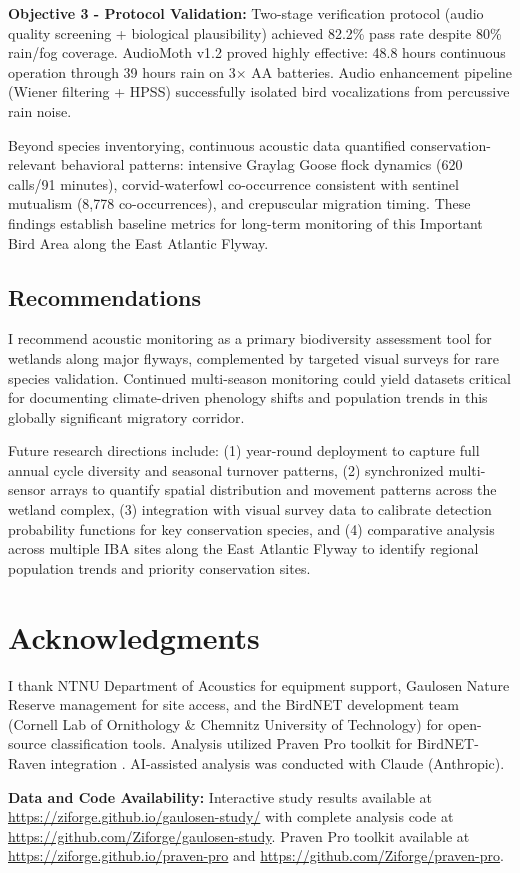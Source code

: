 \documentclass[english,twocolumn]{article}
\begin{document}
\textbf{Objective 3 - Protocol Validation:} Two-stage verification protocol (audio quality screening + biological plausibility) achieved 82.2\% pass rate despite 80\% rain/fog coverage. AudioMoth v1.2 proved highly effective: 48.8 hours continuous operation through 39 hours rain on 3× AA batteries. Audio enhancement pipeline (Wiener filtering + HPSS) successfully isolated bird vocalizations from percussive rain noise.

Beyond species inventorying, continuous acoustic data quantified conservation-relevant behavioral patterns: intensive Graylag Goose flock dynamics (620 calls/91 minutes), corvid-waterfowl co-occurrence consistent with sentinel mutualism (8,778 co-occurrences), and crepuscular migration timing. These findings establish baseline metrics for long-term monitoring of this Important Bird Area along the East Atlantic Flyway.

\subsection{Recommendations}

I recommend acoustic monitoring as a primary biodiversity assessment tool for wetlands along major flyways, complemented by targeted visual surveys for rare species validation. Continued multi-season monitoring could yield datasets critical for documenting climate-driven phenology shifts and population trends in this globally significant migratory corridor.

Future research directions include: (1) year-round deployment to capture full annual cycle diversity and seasonal turnover patterns, (2) synchronized multi-sensor arrays to quantify spatial distribution and movement patterns across the wetland complex, (3) integration with visual survey data to calibrate detection probability functions for key conservation species, and (4) comparative analysis across multiple IBA sites along the East Atlantic Flyway to identify regional population trends and priority conservation sites.

\section*{Acknowledgments}

I thank NTNU Department of Acoustics for equipment support, Gaulosen Nature Reserve management for site access, and the BirdNET development team (Cornell Lab of Ornithology \& Chemnitz University of Technology) for open-source classification tools. Analysis utilized Praven Pro toolkit for BirdNET-Raven integration \citep{Redpath2025}. AI-assisted analysis was conducted with Claude (Anthropic).

\textbf{Data and Code Availability:} Interactive study results available at \url{https://ziforge.github.io/gaulosen-study/} with complete analysis code at \url{https://github.com/Ziforge/gaulosen-study}. Praven Pro toolkit available at \url{https://ziforge.github.io/praven-pro} and \url{https://github.com/Ziforge/praven-pro}.



\end{document}
